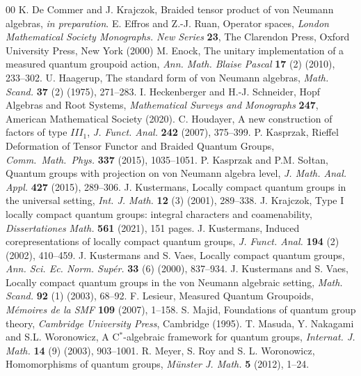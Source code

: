 \documentclass[reqno]{amsart}
\numberwithin{equation}{section}
\begin{document}
\begin{thebibliography}{00}
 K. De Commer and J. Krajczok, Braided tensor product of von Neumann algebras, \emph{in preparation}.
 E. Effros and Z.-J. Ruan, Operator spaces, \emph{London Mathematical Society Monographs. New Series} \textbf{23}, The Clarendon Press, Oxford University Press, New York (2000)
 M. Enock, The unitary implementation of a measured quantum groupoid action, \emph{Ann. Math. Blaise Pascal} \textbf{17} (2) (2010), 233--302.
 U. Haagerup, The standard form of von {N}eumann algebras, \emph{Math. Scand.} \textbf{37} (2) (1975), 271--283.
 I. Heckenberger and H.-J. Schneider, Hopf Algebras and Root Systems, \emph{Mathematical Surveys and Monographs} \textbf{247}, American Mathematical Society (2020). 
 C. Houdayer, A new construction of factors of type $III_1$, \emph{J. Funct. Anal.} \textbf{242} (2007), 375--399.
 P. Kasprzak, Rieffel Deformation of Tensor Functor and Braided Quantum Groups, \emph{Comm.\ Math.\ Phys.} \textbf{337} (2015), 1035--1051.
 P. Kasprzak and P.M. So\l tan, Quantum groups with projection on von Neumann algebra level, \emph{J. Math. Anal. Appl.} \textbf{427} (2015), 289--306. J. Kustermans, Locally compact quantum groups in the universal setting, \emph{Int. J. Math.} \textbf{12} (3) (2001), 289--338.
 J. Krajczok, Type {I} locally compact quantum groups: integral characters
              and coamenability, \emph{Dissertationes Math.} \textbf{561} (2021), 151 pages.
 J. Kustermans, Induced corepresentations of locally compact quantum groups, \emph{J. Funct. Anal.} \textbf{194} (2) (2002), 410--459.
 J. Kustermans and S. Vaes, Locally compact quantum groups, \emph{Ann. Sci. Ec. Norm. Sup\'{e}r.} \textbf{33} (6) (2000), 837--934.
 J. Kustermans and S. Vaes, Locally compact quantum groups in the von Neumann algebraic setting, \emph{Math. Scand.} \textbf{92} (1) (2003), 68--92.
 F. Lesieur, Measured Quantum Groupoids, \emph{M\'{e}moires de la SMF} \textbf{109} (2007), 1--158.
 S. Majid, Foundations of quantum group theory, \emph{Cambridge University Press}, Cambridge (1995).
 T. Masuda, Y. Nakagami and S.L. Woronowicz, A C$^*$-algebraic framework for quantum groups, \emph{Internat. J. Math.} \textbf{14} (9) (2003), 903--1001.
 R. Meyer, S. Roy and S. L. Woronowicz, Homomorphisms of quantum groups, \emph{M\"{u}nster J. Math.} \textbf{5} (2012), 1--24.

\end{thebibliography}
\end{document}
